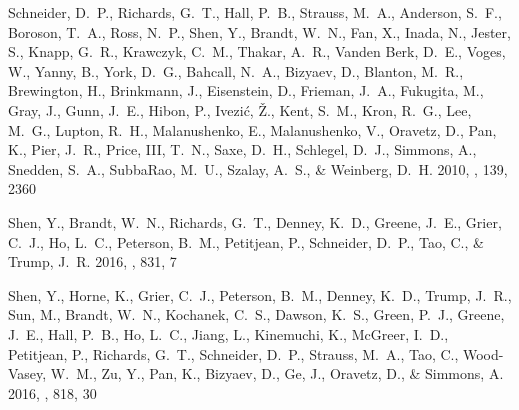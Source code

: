 \documentclass[iop]{emulateapj}
\begin{document}
\begin{thebibliography}{54}
{Schneider}, D.~P., {Richards}, G.~T., {Hall}, P.~B., {Strauss}, M.~A.,
  {Anderson}, S.~F., {Boroson}, T.~A., {Ross}, N.~P., {Shen}, Y., {Brandt},
  W.~N., {Fan}, X., {Inada}, N., {Jester}, S., {Knapp}, G.~R., {Krawczyk},
  C.~M., {Thakar}, A.~R., {Vanden Berk}, D.~E., {Voges}, W., {Yanny}, B.,
  {York}, D.~G., {Bahcall}, N.~A., {Bizyaev}, D., {Blanton}, M.~R.,
  {Brewington}, H., {Brinkmann}, J., {Eisenstein}, D., {Frieman}, J.~A.,
  {Fukugita}, M., {Gray}, J., {Gunn}, J.~E., {Hibon}, P., {Ivezi{\'c}}, {\v
  Z}., {Kent}, S.~M., {Kron}, R.~G., {Lee}, M.~G., {Lupton}, R.~H.,
  {Malanushenko}, E., {Malanushenko}, V., {Oravetz}, D., {Pan}, K., {Pier},
  J.~R., {Price}, III, T.~N., {Saxe}, D.~H., {Schlegel}, D.~J., {Simmons}, A.,
  {Snedden}, S.~A., {SubbaRao}, M.~U., {Szalay}, A.~S., \& {Weinberg}, D.~H.
  2010, \aj, 139, 2360

{Shen}, Y., {Brandt}, W.~N., {Richards}, G.~T., {Denney}, K.~D., {Greene},
  J.~E., {Grier}, C.~J., {Ho}, L.~C., {Peterson}, B.~M., {Petitjean}, P.,
  {Schneider}, D.~P., {Tao}, C., \& {Trump}, J.~R. 2016{}, \apj,
  831, 7

{Shen}, Y., {Horne}, K., {Grier}, C.~J., {Peterson}, B.~M., {Denney}, K.~D.,
  {Trump}, J.~R., {Sun}, M., {Brandt}, W.~N., {Kochanek}, C.~S., {Dawson},
  K.~S., {Green}, P.~J., {Greene}, J.~E., {Hall}, P.~B., {Ho}, L.~C., {Jiang},
  L., {Kinemuchi}, K., {McGreer}, I.~D., {Petitjean}, P., {Richards}, G.~T.,
  {Schneider}, D.~P., {Strauss}, M.~A., {Tao}, C., {Wood-Vasey}, W.~M., {Zu},
  Y., {Pan}, K., {Bizyaev}, D., {Ge}, J., {Oravetz}, D., \& {Simmons}, A.
  2016{}, \apj, 818, 30


\end{thebibliography}
\end{document}
